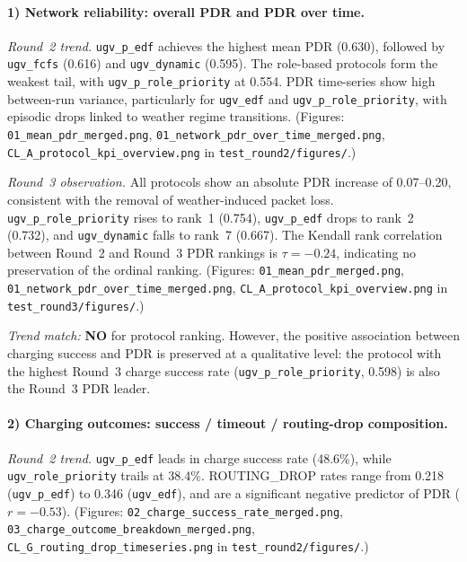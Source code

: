 \paragraph{1) Network reliability: overall PDR and PDR over time.}

\emph{Round~2 trend.}
\texttt{ugv\_p\_edf} achieves the highest mean PDR (0.630), followed by
\texttt{ugv\_fcfs} (0.616) and \texttt{ugv\_dynamic} (0.595).  The
role-based protocols form the weakest tail, with
\texttt{ugv\_p\_role\_priority} at 0.554.  PDR time-series show high
between-run variance, particularly for \texttt{ugv\_edf} and
\texttt{ugv\_p\_role\_priority}, with episodic drops linked to weather
regime transitions.
(Figures: \texttt{01\_mean\_pdr\_merged.png},
\texttt{01\_network\_pdr\_over\_time\_merged.png},
\texttt{CL\_A\_protocol\_kpi\_overview.png} in
\texttt{test\_round2/figures/}.)

\emph{Round~3 observation.}
All protocols show an absolute PDR increase of 0.07--0.20, consistent
with the removal of weather-induced packet loss.
\texttt{ugv\_p\_role\_priority} rises to rank~1 (0.754),
\texttt{ugv\_p\_edf} drops to rank~2 (0.732), and
\texttt{ugv\_dynamic} falls to rank~7 (0.667).
The Kendall rank correlation between Round~2 and Round~3 PDR rankings
is $\tau = -0.24$, indicating no preservation of the ordinal ranking.
(Figures: \texttt{01\_mean\_pdr\_merged.png},
\texttt{01\_network\_pdr\_over\_time\_merged.png},
\texttt{CL\_A\_protocol\_kpi\_overview.png} in
\texttt{test\_round3/figures/}.)

\emph{Trend match:} \textbf{NO} for protocol ranking.
However, the positive association between charging success and PDR
is preserved at a qualitative level: the protocol with the highest
Round~3 charge success rate (\texttt{ugv\_p\_role\_priority}, 0.598)
is also the Round~3 PDR leader.

\paragraph{2) Charging outcomes: success / timeout / routing-drop
composition.}

\emph{Round~2 trend.}
\texttt{ugv\_p\_edf} leads in charge success rate (48.6\%), while
\texttt{ugv\_role\_priority} trails at 38.4\%.  ROUTING\_DROP rates
range from 0.218 (\texttt{ugv\_p\_edf}) to 0.346 (\texttt{ugv\_edf}),
and are a significant negative predictor of PDR ($r = -0.53$).
(Figures: \texttt{02\_charge\_success\_rate\_merged.png},
\texttt{03\_charge\_outcome\_breakdown\_merged.png},
\texttt{CL\_G\_routing\_drop\_timeseries.png} in
\texttt{test\_round2/figures/}.)

